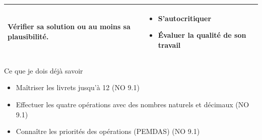 \begin{tabularx}{\textwidth}{|>{\raggedright\arraybackslash}X|>{\raggedright\arraybackslash}X|}
Vérifier sa solution ou au moins sa plausibilité.
&\vspace{-1em}
\begin{itemize}[leftmargin=*, itemsep=2pt, topsep=0pt, label=$\triangleright$]
    \item S'autocritiquer
    \item Évaluer la qualité de son travail
\end{itemize} \\
\hline
\end{tabularx}
\def\arraystretch{1}


\vfill
\begin{astuce}{Ce que je dois déjà savoir}
\begin{itemize}[leftmargin=*, itemsep=2pt, topsep=2pt, label=$\triangleright$]
    \item Maîtriser les livrets jusqu'à 12 \hfill (NO 9.1)
    \item Effectuer les quatre opérations avec des nombres naturels et décimaux \hfill (NO 9.1)
    \item Connaître les priorités des opérations (\textcolor{themeNO}{PEMDAS}) \hfill (NO 9.1)
\end{itemize}
\end{astuce}

